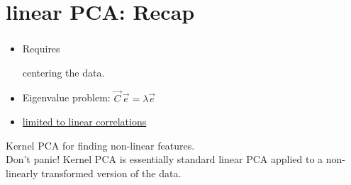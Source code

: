 
\section{linear PCA: Recap}

\begin{frame}\frametitle{\secname}
\begin{itemize}
\item Requires \pause

 centering the data.

\pause
 
\item Eigenvalue problem: $\vec C\,\vec e = \lambda \vec e$
\item \underline{limited to linear correlations}
\end{itemize}

Kernel PCA for finding non-linear features.\\

Don't panic! Kernel PCA is essentially standard linear PCA applied to a non-linearly transformed version of the data.

\end{frame}
